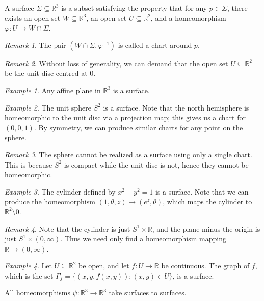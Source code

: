 \documentclass[11pt]{article}
\newcommand{\R}{\mathbb{R}}
\theoremstyle{definition}
\theoremstyle{remark}
\newtheorem*{remark}{Remark}
\newtheorem*{example}{Example}
\numberwithin{equation}{section}
\begin{document}
    \begin{definition}
        A surface $\Sigma \subseteq \R^3$ is a subset satisfying the property that
        for any $p \in \Sigma$, there exists an open set $W \subseteq \R^3$, an
        open set $U \subseteq \R^2$, and a homeomorphism $\varphi\colon U \to W \cap
        \Sigma$.
        \begin{remark}
            The pair $(W\cap \Sigma, \varphi^{-1})$ is called a chart around $p$.
        \end{remark}
        \begin{remark}
            Without loss of generality, we can demand that the open set $U\subseteq
            \R^2$ be the unit disc centred at $0$.
        \end{remark}
    \end{definition}

    \begin{example}
        Any affine plane in $\R^3$ is a surface.
    \end{example}
    \begin{example}
        The unit sphere $S^2$ is a surface. Note that the north hemisphere is
        homeomorphic to the unit disc via a projection map; this gives us a chart for
        $(0, 0, 1)$. By symmetry, we can produce similar charts for any point on the
        sphere.
        \begin{remark}
            The sphere cannot be realized as a surface using only a single chart.
            This is because $S^2$ is compact while the unit disc is not, hence they
            cannot be homeomorphic.
        \end{remark}
    \end{example}
    \begin{example}
        The cylinder defined by $x^2 + y^2 = 1$ is a surface. Note that we can
        produce the homeomorphism $(1, \theta, z) \mapsto (e^z, \theta)$, which maps
        the cylinder to $\R^2\setminus 0$.
        \begin{remark}
            Note that the cylinder is just $S^1\times \R$, and the plane minus the
            origin is just $S^1\times (0, \infty)$. Thus we need only find a
            homeomorphism mapping $\R \to (0, \infty)$.
        \end{remark}
    \end{example}

    \begin{example}
        Let $U\subseteq \R^2$ be open, and let $f\colon U \to \R$ be continuous. The
        graph of $f$, which is the set $\Gamma_f = \{(x, y, f(x, y)): (x, y) \in
        U\}$, is a surface.
    \end{example}

    \begin{lemma}
        All homeomorphisms $\psi\colon \R^3 \to \R^3$ take surfaces to surfaces.
    \end{lemma}
    
    
\end{document}
